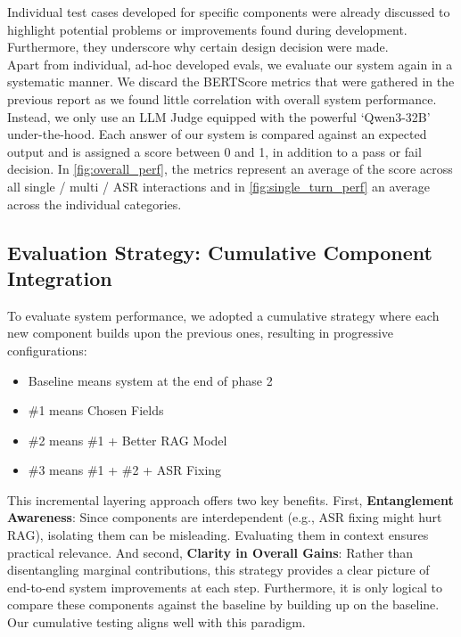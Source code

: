 \documentclass{article}
\begin{document}

Individual test cases developed for specific components were already discussed to highlight potential problems or improvements found during development. Furthermore, they underscore why certain design decision were made.\\

Apart from individual, ad-hoc developed evals, we evaluate our system again in a systematic manner. We discard the BERTScore metrics that were gathered in the previous report as we found little correlation with overall system performance. Instead, we only use an LLM Judge equipped with the powerful `Qwen3-32B' under-the-hood. Each answer of our system is compared against an expected output and is assigned a score between 0 and 1, in addition to a pass or fail decision. In \ref{fig:overall_perf}, the metrics represent an average of the score across all single / multi / ASR interactions and in \ref{fig:single_turn_perf} an average across the individual categories.


\subsection{Evaluation Strategy: Cumulative Component Integration}

To evaluate system performance, we adopted a cumulative strategy where each new component builds upon the previous ones, resulting in progressive configurations:
\begin{itemize}
    \item Baseline means system at the end of phase 2
    \item \#1 means Chosen Fields
    \item \#2 means \#1 + Better RAG Model
    \item \#3 means  \#1 + \#2 + ASR Fixing
\end{itemize}

This incremental layering approach offers two key benefits. First,
\textbf{Entanglement Awareness}: Since components are interdependent (e.g., ASR fixing might hurt RAG), isolating them can be misleading. Evaluating them in context ensures practical relevance. And second, \textbf{Clarity in Overall Gains}: Rather than disentangling marginal contributions, this strategy provides a clear picture of end-to-end system improvements at each step. Furthermore, it is only logical to compare these components against the baseline by building up on the baseline. Our cumulative testing aligns well with this paradigm.
\end{document}
